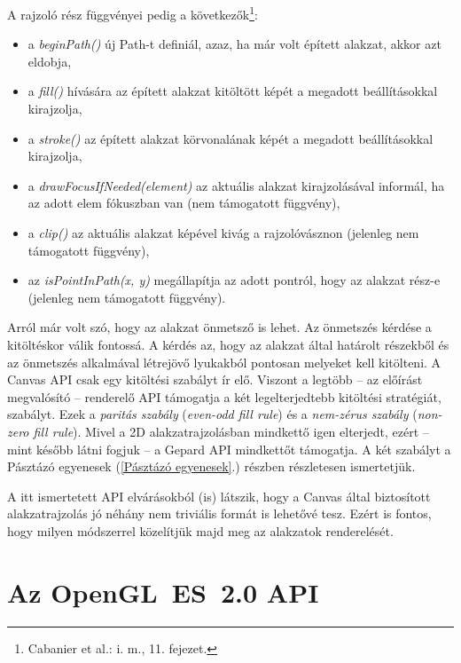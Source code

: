 \documentclass[12pt]{report}
\theoremstyle{definition}
\newcommand{\inenglish}[1]{\textsl{#1}}
\newcommand{\func}[1]{{\textsl{#1}}}
\begin{document}
A rajzoló rész függvényei pedig a következők\footnote{Cabanier et al.: i.
m., 11. fejezet.}:
\begin{itemize}
  \item a \func{beginPath()} új Path-t definiál, azaz, ha már volt épített
  alakzat, akkor azt eldobja,
  \item a \func{fill()} hívására az épített alakzat kitöltött képét a
  megadott beállításokkal kirajzolja,
  \item a \func{stroke()} az épített alakzat körvonalának képét a
  megadott beállításokkal kirajzolja,
  \item a \func{drawFocusIfNeeded(element)} az aktuális alakzat kirajzolásával
   informál, ha az adott elem fókuszban van (nem támogatott függvény),
  \item a \func{clip()} az aktuális alakzat képével kivág a
  rajzolóvásznon (jelenleg nem támogatott függvény),
  \item az \func{isPointInPath(x, y)} megállapítja az adott pontról, hogy az
  alakzat rész-e (jelenleg nem támogatott függvény).
\end{itemize}

Arról már volt szó, hogy az alakzat önmetsző is lehet. Az önmetszés kérdése a
kitöltéskor válik fontossá. A kérdés az, hogy az alakzat által határolt
részekből és az önmetszés alkalmával létrejövő lyukakból pontosan melyeket kell
kitölteni. A Canvas API csak egy kitöltési szabályt ír elő. Viszont a legtöbb
-- az előírást megvalósító -- renderelő API támogatja a két legelterjedtebb
kitöltési stratégiát, szabályt. Ezek a \emph{paritás szabály}
(\inenglish{even-odd fill rule}) és a \emph{nem-zérus szabály}
(\inenglish{non-zero fill rule}). Mivel a 2D alakzatrajzolásban mindkettő igen
elterjedt, ezért -- mint később látni fogjuk -- a Gepard API mindkettőt
támogatja. A két szabályt a Pásztázó egyenesek (\ref{Pásztázó egyenesek}.)
részben részletesen ismertetjük.

A itt ismertetett API elvárásokból (is) látszik, hogy a Canvas által
biztosított alakzatrajzolás jó néhány nem triviális formát is lehetővé tesz.
Ezért is fontos, hogy milyen módszerrel közelítjük majd meg az alakzatok
renderelését.

    \section{Az OpenGL~ES~2.0 API}
    \label{GLES2:API}
\end{document}
